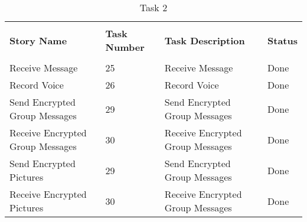 \documentclass[a4paper]{article}
\begin{document}
\begin{table} [H] 
\begin{tabular}{p{3cm} p{3cm} p{3.5cm} p{1cm}} 
\hline %
&&&\\
\textbf{Story Name} & \textbf{Task Number} & \textbf{Task Description} & \textbf{Status}\\ %
&&&\\
\hline

 
 Receive Message & 25 & Receive Message & Done\\ 
 \midrule
 
 Record Voice & 26 & Record Voice & Done\\ 
\midrule

  Send Encrypted Group Messages & 29 & Send Encrypted Group Messages & Done\\ 
 \midrule
 
 Receive Encrypted Group Messages & 30 & Receive Encrypted Group Messages & Done\\ 
 \midrule

 
  Send Encrypted Pictures & 29 & Send Encrypted Group Messages & Done\\ 
 \midrule
 
 Receive Encrypted Pictures & 30 & Receive Encrypted Group Messages & Done\\ 
\hline

\end{tabular}
\caption{Task 2} %
\label{tab:template} %
\end{table}
\end{document}

